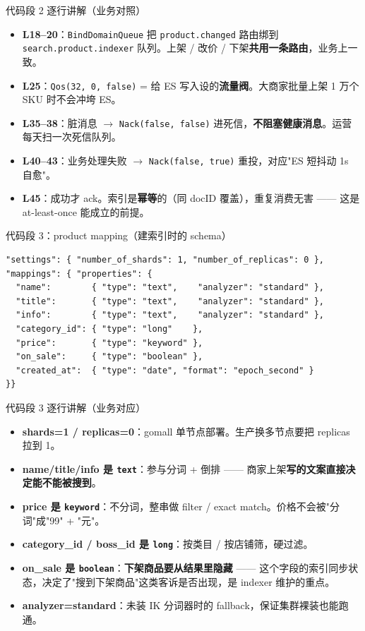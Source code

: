 \documentclass[aspectratio=169,11pt]{beamer}
\begin{document}
\begin{frame}[shrink]{代码段 2 逐行讲解（业务对照）}
\begin{itemize}
  \item \textbf{L18--20}：\texttt{BindDomainQueue} 把 \texttt{product.changed} 路由绑到 \texttt{search.product.indexer} 队列。上架 / 改价 / 下架\textbf{共用一条路由}，业务上一致。
  \item \textbf{L25}：\texttt{Qos(32, 0, false)} = 给 ES 写入设的\textbf{流量阀}。大商家批量上架 1 万个 SKU 时不会冲垮 ES。
  \item \textbf{L35--38}：脏消息 $\to$ \texttt{Nack(false, false)} 进死信，\textbf{不阻塞健康消息}。运营每天扫一次死信队列。
  \item \textbf{L40--43}：业务处理失败 $\to$ \texttt{Nack(false, true)} 重投，对应"ES 短抖动 1s 自愈"。
  \item \textbf{L45}：成功才 ack。索引是\textbf{幂等}的（同 docID 覆盖），重复消费无害 —— 这是 at-least-once 能成立的前提。
\end{itemize}
\end{frame}

\begin{frame}{代码段 3：product mapping（建索引时的 schema）}
\begin{lstlisting}[firstnumber=20,basicstyle=\ttfamily\tiny]
"settings": { "number_of_shards": 1, "number_of_replicas": 0 },
"mappings": { "properties": {
  "name":        { "type": "text",    "analyzer": "standard" },
  "title":       { "type": "text",    "analyzer": "standard" },
  "info":        { "type": "text",    "analyzer": "standard" },
  "category_id": { "type": "long"    },
  "price":       { "type": "keyword" },
  "on_sale":     { "type": "boolean" },
  "created_at":  { "type": "date", "format": "epoch_second" }
}}
\end{lstlisting}
\end{frame}

\begin{frame}[shrink]{代码段 3 逐行讲解（业务对应）}
\begin{itemize}
  \item \textbf{shards=1 / replicas=0}：gomall 单节点部署。生产换多节点要把 replicas 拉到 1。
  \item \textbf{name/title/info 是 \texttt{text}}：参与分词 + 倒排 —— 商家上架\textbf{写的文案直接决定能不能被搜到}。
  \item \textbf{price 是 \texttt{keyword}}：不分词，整串做 filter / exact match。价格不会被"分词"成"99" + "元"。
  \item \textbf{category\_id / boss\_id 是 \texttt{long}}：按类目 / 按店铺筛，硬过滤。
  \item \textbf{on\_sale 是 \texttt{boolean}}：\textbf{下架商品要从结果里隐藏} —— 这个字段的索引同步状态，决定了"搜到下架商品"这类客诉是否出现，是 indexer 维护的重点。
  \item \textbf{analyzer=standard}：未装 IK 分词器时的 fallback，保证集群裸装也能跑通。
\end{itemize}
\end{frame}
\end{document}
